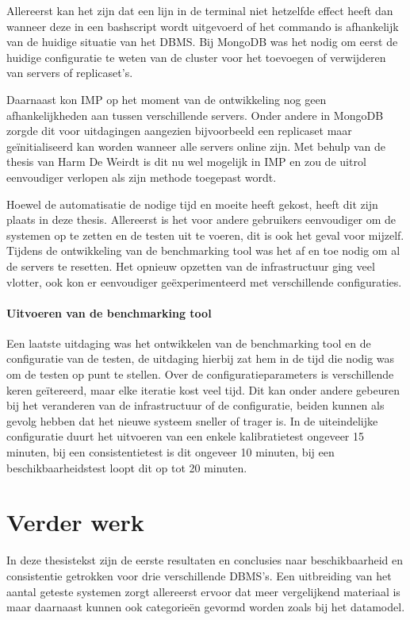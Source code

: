 Allereerst kan het zijn dat een lijn in de terminal niet hetzelfde effect heeft dan wanneer deze in een bashscript wordt uitgevoerd of het commando is afhankelijk van de huidige situatie van het DBMS. Bij MongoDB was het nodig om eerst de huidige configuratie te weten van de cluster voor het toevoegen of verwijderen van servers of replicaset's. 

Daarnaast kon IMP op het moment van de ontwikkeling nog geen afhankelijkheden aan tussen verschillende servers. Onder andere in MongoDB zorgde dit voor uitdagingen aangezien bijvoorbeeld een replicaset maar geïnitialiseerd kan worden wanneer alle servers online zijn. Met behulp van de thesis van Harm De Weirdt\cite{thesisHarm} is dit nu wel mogelijk in IMP en zou de uitrol eenvoudiger verlopen als zijn methode toegepast wordt.  

Hoewel de automatisatie de nodige tijd en moeite heeft gekost, heeft dit zijn plaats in deze thesis. Allereerst is het voor andere gebruikers eenvoudiger om de systemen op te zetten en de testen uit te voeren, dit is ook het geval voor mijzelf. Tijdens de ontwikkeling van de benchmarking tool was het af en toe nodig om al de servers te resetten. Het opnieuw opzetten van de infrastructuur ging veel vlotter, ook kon er eenvoudiger geëxperimenteerd met verschillende configuraties. 

\paragraph{Uitvoeren van de benchmarking tool} Een laatste uitdaging was het ontwikkelen van de benchmarking tool en de configuratie van de testen, de uitdaging hierbij zat hem in de tijd die nodig was om de testen op punt te stellen. Over de configuratieparameters is verschillende keren geïtereerd, maar elke iteratie kost veel tijd. Dit kan onder andere gebeuren bij het veranderen van de infrastructuur of de configuratie, beiden kunnen als gevolg hebben dat het nieuwe systeem sneller of trager is. In de uiteindelijke configuratie duurt het uitvoeren van een enkele kalibratietest ongeveer 15 minuten, bij een consistentietest is dit ongeveer 10 minuten, bij een beschikbaarheidstest loopt dit op tot 20 minuten. 

\section{Verder werk}
In deze thesistekst zijn de eerste resultaten en conclusies naar beschikbaarheid en consistentie getrokken voor drie verschillende DBMS's. Een uitbreiding van het aantal geteste systemen zorgt allereerst ervoor dat meer vergelijkend materiaal is maar daarnaast kunnen ook categorieën gevormd worden zoals bij het datamodel. 

